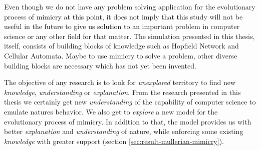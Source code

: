 Even though we do not have any problem solving application for the evolutionary process of mimicry at this point, it does not imply that this study will not be useful in the future to give us solution to an important problem in computer science or any other field for that matter. The simulation presented in this thesis, itself, consists of building blocks of knowledge such as Hopfield Network and Cellular Automata. Maybe to use mimicry to solve a problem, other diverse building blocks are necessary which has not yet been invented.

The objective of any research is to look for \textsl{unexplored} territory to find new \textsl{knowledge}, \textsl{understanding} or \textsl{explanation}. From the research presented in this thesis we certainly get new \textsl{understanding} of the capability of computer science to emulate natures behavior. We also get to \textsl{explore} a new model for the evolutionary process of  mimicry. In addition to that, the model provides us with better \textsl{explanation} and \textsl{understanding} of nature, while enforcing some existing \textsl{knowledge} with greater support (section \ref{sec:result-mullerian-mimicry}). 